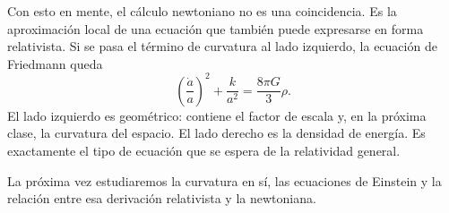 Con esto en mente, el cálculo newtoniano no es una coincidencia. Es la aproximación local de una ecuación que también puede expresarse en forma relativista. Si se pasa el término de curvatura al lado izquierdo, la ecuación de Friedmann queda
\begin{equation}
\left(\frac{\dot a}{a}\right)^2+\frac{k}{a^2}=\frac{8\pi G}{3}\rho.
\end{equation}
El lado izquierdo es geométrico: contiene el factor de escala y, en la próxima clase, la curvatura del espacio. El lado derecho es la densidad de energía. Es exactamente el tipo de ecuación que se espera de la relatividad general.

La próxima vez estudiaremos la curvatura en sí, las ecuaciones de Einstein y la relación entre esa derivación relativista y la newtoniana.
